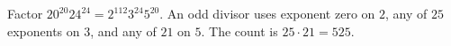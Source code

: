Factor $20^{20}24^{24}=2^{112}3^{24}5^{20}$. An odd divisor uses exponent zero on $2$, any of $25$ exponents on $3$, and any of $21$ on $5$. The count is $25\cdot21=\boxed{525}$.
